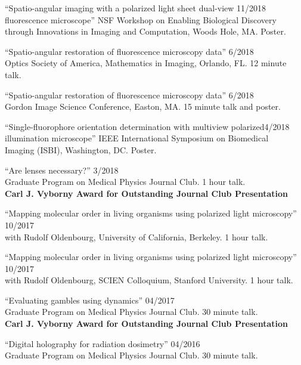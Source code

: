 \documentclass[12pt,letterpaper]{article}
\begin{document}
\begin{etaremune}[labelsep=0.035\textwidth]
\item {``Spatio-angular imaging with a polarized light sheet dual-view  \hfill 11/2018\\
    fluorescence microscope'' NSF Workshop on Enabling Biological Discovery\\ through
    Innovations in Imaging and Computation, Woods Hole, MA. Poster.}
  
\item {``Spatio-angular restoration of fluorescence microscopy data'' \hfill 6/2018\\
      Optics Society of America, Mathematics in Imaging, Orlando, FL. 12 minute talk.}
  
\item {``Spatio-angular restoration of fluorescence microscopy data'' \hfill 6/2018\\
      Gordon Image Science Conference, Easton, MA. 15 minute talk and poster.}

  \item {``Single-fluorophore orientation determination with multiview polarized\hfill 4/2018\\
      illumination microscope'' IEEE International Symposium on Biomedical\\ Imaging (ISBI), Washington, DC. Poster.}
  
\item {``Are lenses necessary?'' \hfill 3/2018\\
    Graduate Program on Medical Physics Journal Club. 1 hour talk.\\
    \textbf{Carl J. Vyborny Award for Outstanding Journal Club Presentation}  }
  
\item {``Mapping molecular order in living organisms using polarized light microscopy'' \hfill 10/2017\\
    with Rudolf Oldenbourg, University of California, Berkeley. 1 hour talk.}
  
\item {``Mapping molecular order in living organisms using polarized light microscopy'' \hfill 10/2017\\
    with Rudolf Oldenbourg, SCIEN Colloquium, Stanford University. 1 hour talk.}
  
\item {``Evaluating gambles using dynamics'' \hfill 04/2017\\
    Graduate Program on Medical Physics Journal Club. 30 minute talk.\\
    \textbf{Carl J. Vyborny Award for Outstanding Journal Club Presentation}}

\item {``Digital holography for radiation dosimetry'' \hfill 04/2016\\
    Graduate Program on Medical Physics Journal Club. 30 minute talk.}
\end{etaremune}
\end{document}
